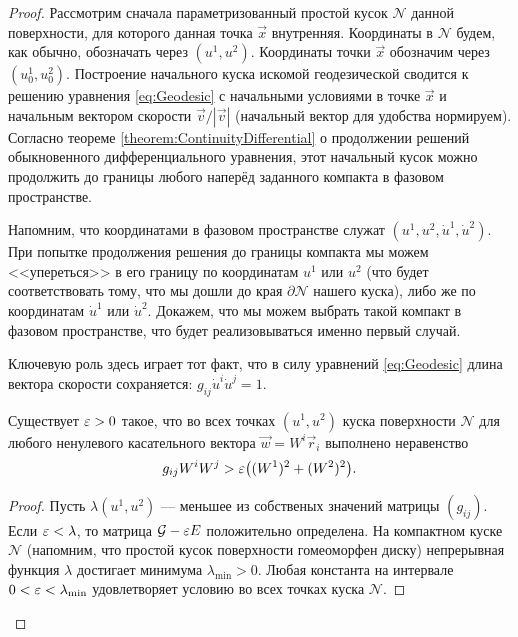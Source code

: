 \begin{proof}
	Рассмотрим сначала параметризованный простой кусок $\mathcal{N}$ данной поверхности, для которого данная точка $\vec{x}$ внутренняя. Координаты в $\mathcal{N}$ будем, как обычно, обозначать через $(u^1, u^2)$. Координаты точки $\vec{x}$ обозначим через $(u_0^1, u_0^2)$. Построение начального куска искомой геодезической сводится к решению уравнения \eqref{eq:Geodesic} с начальными условиями в точке $\vec{x}$ и начальным вектором скорости $\vec{v} / |\vec{v}|$ (начальный вектор для удобства нормируем). Согласно теореме \ref{theorem:ContinuityDifferential} о продолжении решений обыкновенного дифференциального уравнения, этот начальный кусок можно продолжить до границы любого наперёд заданного компакта в фазовом пространстве.

	Напомним, что координатами в фазовом пространстве служат $(u^1, u^2, \dot{u}^1, \dot{u}^2)$. При попытке продолжения решения до границы компакта мы можем <<упереться>> в его границу по координатам $u^1$ или $u^2$ (что будет соответствовать тому, что мы дошли до края $\partial\mathcal{N}$ нашего куска), либо же по координатам $\dot{u}^1$ или $\dot{u}^2$. Докажем, что мы можем выбрать такой компакт в фазовом пространстве, что будет реализовываться именно первый случай.

	Ключевую роль здесь играет тот факт, что в силу уравнений \eqref{eq:Geodesic} длина вектора скорости сохраняется: $g_{ij}\dot{u}^i\dot{u}^j = 1$.

	\begin{lemma}
		Существует $\varepsilon > 0$ такое, что во всех точках $(u^1, u^2)$ куска поверхности $\mathcal{N}$ для любого ненулевого касательного вектора $\vec{w} = W^i\vec{r}_i$ выполнено неравенство
		\[
			g_{ij}W^iW^j > \varepsilon\big((W^1)^2 + (W^2)^2\big).
		\]
	\end{lemma}

	\begin{proof}
		Пусть $\lambda(u^1, u^2)$ --- меньшее из собственых значений матрицы $(g_{ij})$. Если $\varepsilon < \lambda$, то матрица $\mathcal{G} - \varepsilon E$ положительно определена. На компактном куске $\mathcal{N}$ (напомним, что простой кусок поверхности гомеоморфен диску) непрерывная функция $\lambda$ достигает минимума $\lambda_{\min} > 0$. Любая константа на интервале $0 < \varepsilon < \lambda_{\min}$ удовлетворяет условию во всех точках куска $\mathcal{N}$.
	\end{proof}


\end{proof}
